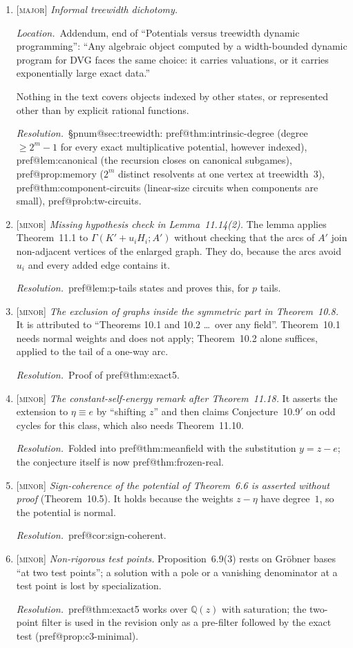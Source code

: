\documentclass[11pt]{amsart}
\makeatletter
\newcommand{\pref}[1]{\csname pref@#1\endcsname}
\newcommand{\pnum}[1]{\csname pnum@#1\endcsname}
\newcommand{\Qz}{\mathbb{Q}(z)}
\newcommand{\sev}[1]{\textsc{[#1]}}
\newcommand{\fix}{\par\noindent\emph{Resolution.}\ }
\newcommand{\where}[1]{\par\noindent\emph{Location.}\ #1\par\noindent}
\makeatother
\begin{document}
\begin{enumerate}[label=\textbf{I.\arabic*},leftmargin=*,widest=I.22]
\item \sev{major} \emph{Informal treewidth dichotomy.}
\where{Addendum, end of ``Potentials versus treewidth dynamic programming'': ``Any algebraic object computed by a width-bounded dynamic program for DVG faces the same choice: it carries valuations, or it carries exponentially large exact data.''}
Nothing in the text covers objects indexed by other states, or represented other than by explicit rational functions.
\fix \S\pnum{sec:treewidth}: \pref{thm:intrinsic-degree} (degree $\ge2^{m}-1$ for every exact multiplicative potential, however indexed), \pref{lem:canonical} (the recursion closes on canonical subgames), \pref{prop:memory} ($2^{m}$ distinct resolvents at one vertex at treewidth~$3$), \pref{thm:component-circuits} (linear-size circuits when components are small), \pref{prob:tw-circuits}.

\item \sev{minor} \emph{Missing hypothesis check in Lemma~11.14(2).}
The lemma applies Theorem~11.1 to $\Gamma(K'+u_iH_i;A')$ without checking that the arcs of $A'$ join non-adjacent vertices of the enlarged graph. They do, because the arcs avoid $u_i$ and every added edge contains it.
\fix \pref{lem:p-tails} states and proves this, for $p$ tails.

\item \sev{minor} \emph{The exclusion of graphs inside the symmetric part in Theorem~10.8.}
It is attributed to ``Theorems 10.1 and 10.2 \dots\ over any field''. Theorem~10.1 needs normal weights and does not apply; Theorem~10.2 alone suffices, applied to the tail of a one-way arc.
\fix Proof of \pref{thm:exact5}.

\item \sev{minor} \emph{The constant-self-energy remark after Theorem~11.18.}
It asserts the extension to $\eta\equiv e$ by ``shifting $z$'' and then claims Conjecture~10.9$'$ on odd cycles for this class, which also needs Theorem~11.10.
\fix Folded into \pref{thm:meanfield} with the substitution $y=z-e$; the conjecture itself is now \pref{thm:frozen-real}.

\item \sev{minor} \emph{Sign-coherence of the potential of Theorem~6.6 is asserted without proof} (Theorem~10.5). It holds because the weights $z-\eta$ have degree~$1$, so the potential is normal.
\fix \pref{cor:sign-coherent}.

\item \sev{minor} \emph{Non-rigorous test points.} Proposition~6.9(3) rests on Gr\"obner bases ``at two test points''; a solution with a pole or a vanishing denominator at a test point is lost by specialization.
\fix \pref{thm:exact5} works over $\Qz$ with saturation; the two-point filter is used in the revision only as a pre-filter followed by the exact test (\pref{prop:c3-minimal}).


\end{enumerate}
\end{document}
